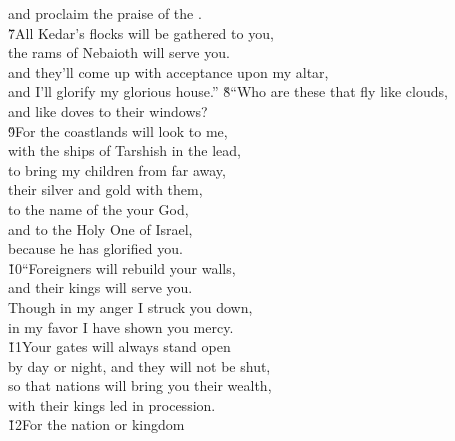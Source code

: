 \begin{poetry}
\poemll    and proclaim the praise of the . \\
\poeml \v{7}All Kedar's flocks will be gathered to you, \\
\poemll    the rams of Nebaioth will serve you. \\
\poeml and they'll come up with acceptance upon my altar, \\
\poemll    and I'll glorify my glorious house.''
\poeml \v{8}``Who are these that fly like clouds, \\
\poemll    and like doves to their windows? \\
\poeml \v{9}For the coastlands will look to me, \\
\poemll    with the ships of Tarshish in the lead, \\
\poeml to bring my children from far away, \\
\poemll    their silver and gold with them, \\
\poeml to the name of the  your God, \\
\poemll    and to the Holy One of Israel, \\
\poemlll       because he has glorified you. \\
\poeml \v{10}``Foreigners will rebuild your walls, \\
\poemll    and their kings will serve you. \\
\poeml Though in my anger I struck you down, \\
\poemlll       in my favor I have shown you mercy. \\
\poeml \v{11}Your gates will always stand open \\
\poemll    by day or night, and they will not be shut, \\
\poeml so that nations will bring you their wealth, \\
\poemll    with their kings led in procession. \\
\poeml \v{12}For the nation or kingdom \\

\end{poetry}
